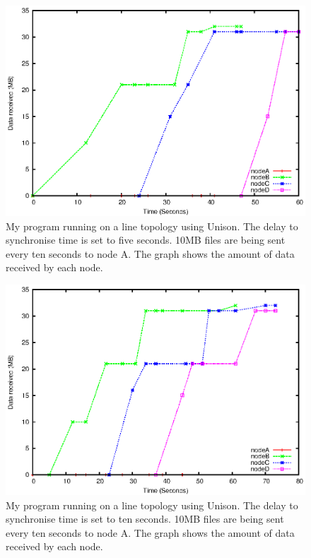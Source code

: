 \documentclass[12pt]{article}
\begin{document}
\newpage
\begin{figure}[ht!]
\centering
\includegraphics[height=0.38\textheight]{images/line-uni-10-5.eps}
\caption{My program running on a line topology using Unison.
The delay to synchronise time is set to five seconds.
10MB files are being sent every ten seconds to node A. The graph
shows the amount of data received by each node.}
\label{fig:line_uni_10_5}
\end{figure}

\begin{figure}[hb!]
\centering
\includegraphics[height=0.38\textheight]{images/line-uni-10-10.eps}
\caption{My program running on a line topology using Unison.
The delay to synchronise time is set to ten seconds.
10MB files are being sent every ten seconds to node A. The graph
shows the amount of data received by each node.}
\label{fig:line_uni_10_10}
\end{figure}
\end{document}

